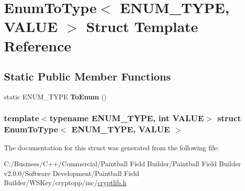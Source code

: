 \hypertarget{struct_enum_to_type}{
\section{EnumToType$<$ ENUM\_\-TYPE, VALUE $>$ Struct Template Reference}
\label{struct_enum_to_type}
}
\subsection*{Static Public Member Functions}
\begin{DoxyCompactItemize}
\item 
\hypertarget{struct_enum_to_type_afe0316d264db930e7cd0c4b829599213}{
static ENUM\_\-TYPE {\bfseries ToEnum} ()}
\label{struct_enum_to_type_afe0316d264db930e7cd0c4b829599213}

\end{DoxyCompactItemize}
\subsubsection*{template$<$typename ENUM\_\-TYPE, int VALUE$>$ struct EnumToType$<$ ENUM\_\-TYPE, VALUE $>$}



The documentation for this struct was generated from the following file:\begin{DoxyCompactItemize}
\item 
C:/Business/C++/Commercial/Paintball Field Builder/Paintball Field Builder v2.0.0/Software Development/Paintball Field Builder/WSKey/cryptopp/inc/\hyperlink{cryptlib_8h}{cryptlib.h}\end{DoxyCompactItemize}
